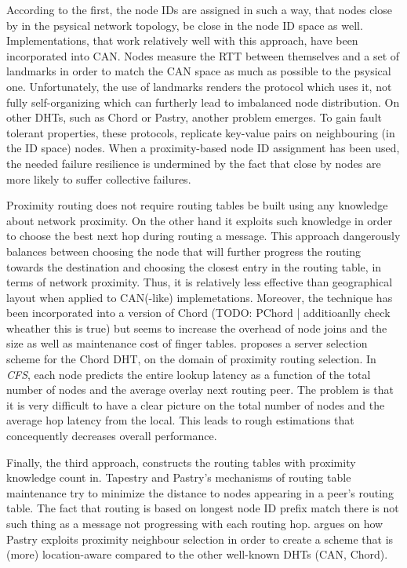 \documentclass[a4paper,10pt]{article}
\begin{document}
According to the first, the node IDs are assigned in such a way, that nodes close by in the psysical network topology, be close in the node ID space as well. Implementations, that work relatively well with this approach, have been incorporated into CAN. Nodes measure the RTT between themselves and a set of landmarks in order to match the CAN space as much as possible to the psysical one. Unfortunately, the use of landmarks renders the protocol which uses it, not fully self-organizing which can furtherly lead to imbalanced node distribution. On other DHTs, such as Chord or Pastry, another problem emerges. To gain fault tolerant properties, these protocols, replicate key-value pairs on neighbouring (in the ID space) nodes. When a proximity-based node ID assignment has been used, the needed failure resilience is undermined by the fact that close by nodes are more likely to suffer collective failures.

Proximity routing does not require routing tables be built using any knowledge about network proximity. On the other hand it exploits such knowledge in order to choose the best next hop during routing a message. This approach dangerously balances between choosing the node that will further progress the routing towards the destination and choosing the closest entry in the routing table, in terms of network proximity. Thus, it is relatively less effective than geographical layout when applied to CAN(-like) implemetations. Moreover, the technique has been incorporated into a version of Chord (TODO: PChord | additioanlly check wheather this is true) but seems to increase the overhead of node joins and the size as well as maintenance cost of finger tables. \cite{dabek_cfs_2001} proposes a server selection scheme for the Chord DHT, on the domain of proximity routing selection. In \emph{CFS}, each node predicts the entire lookup latency as a function of the total number of nodes and the average overlay next routing peer. The problem is that it is very difficult to have a clear picture on the total number of nodes and the average hop latency from the local. This leads to rough estimations that concequently decreases overall performance.

Finally, the third approach, constructs the routing tables with proximity knowledge count in. Tapestry and Pastry's mechanisms of routing table maintenance try to minimize the distance to nodes appearing in a peer's routing table. The fact that routing is based on longest node ID prefix match there is not such thing as a message not progressing with each routing hop. \cite{castro_proximityp2p_2002} argues on how Pastry exploits proximity neighbour selection in order to create a scheme that is (more) location-aware compared to the other well-known DHTs (CAN, Chord).
\end{document}
